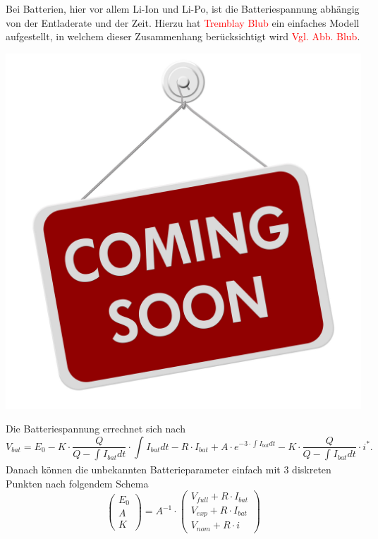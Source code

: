 Bei Batterien, hier vor allem Li-Ion und Li-Po, ist die Batteriespannung abhängig von der Entladerate und der Zeit. Hierzu hat \textcolor{red}{Tremblay Blub} ein einfaches Modell aufgestellt, in welchem dieser Zusammenhang berücksichtigt wird \textcolor{red}{Vgl. Abb. Blub}. 
\begin{center}
	\includegraphics[scale=0.2]{images/Coming-Soon.jpg}
\end{center}
Die Batteriespannung errechnet sich nach 
\begin{equation}
	V_{bat} = E_0-K\cdot\frac{Q}{Q-\int_{}^{} I_{bat} dt}\cdot\int_{}^{} I_{bat} dt - R\cdot I_{bat}+A\cdot e^{-3\cdot\int_{}^{} I_{bat} dt}-K\cdot\frac{Q}{Q-\int_{}^{} I_{bat} dt}\cdot i^* .
\end{equation}
Danach können die unbekannten Batterieparameter einfach mit 3 diskreten Punkten nach folgendem Schema
\begin{equation}
	\begin{pmatrix} E_0 \\ A \\ K \end{pmatrix} = A^{-1}\cdot \begin{pmatrix}
	V_{full}+R\cdot I_{bat} \\ V_{exp}+R\cdot I_{bat} \\ V_{nom}+R\cdot i \end{pmatrix}
\end{equation}
